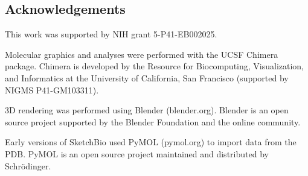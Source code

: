 \documentclass[twocolumn]{bmcart}%
\begin{document}
\subsection*{Acknowledgements}
This work was supported by NIH grant 5-P41-EB002025.

Molecular graphics and analyses were performed with the UCSF Chimera package.
Chimera is developed by the Resource for Biocomputing, Visualization, and Informatics at the University of California, San Francisco (supported by NIGMS P41-GM103311).

3D rendering was performed using Blender (blender.org).
Blender is an open source project supported by the Blender Foundation and the online community.

Early versions of SketchBio used PyMOL (pymol.org) to import data from the PDB.
PyMOL is an open source project maintained and distributed by Schrödinger.

\end{document}
